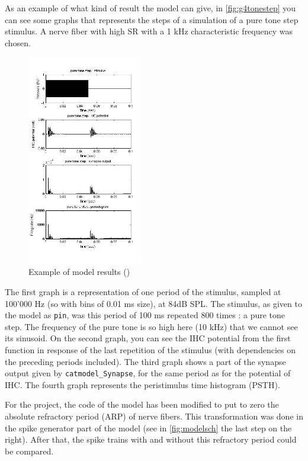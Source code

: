 As an example of what kind of result the model can give,
in \autoref{fig:g4tonestep} you can see some graphs that represents the steps of a 
simulation of a pure tone step stimulus.
A nerve fiber with high SR with a 1 kHz characteristic frequency 
was chosen.


\begin{figure}[h]
	\centering
	\includegraphics[width=0.45\textwidth]{images/g4-tonestep-column2.jpg}
	\caption{Example of model results (\cite{Model1})}
	\label{fig:g4tonestep}
\end{figure}

The first graph is a representation of one period of the stimulus, 
sampled at 100'000 Hz (so with bins of 0.01 ms size), at 84dB SPL.
The stimulus, as given to the model as \texttt{pin}, was this period of 100 ms repeated 800
times : a pure tone step. 
The frequency of the pure tone is so high here (10 kHz) that we cannot see its sinusoid.
On the second graph, you can see the IHC potential from the first function
in response of the last repetition of the stimulus 
(with dependencies on the preceding periods included).
The third graph shows a part of the synapse output given by \texttt{catmodel\_Synapse}, 
for the same period as for the potential of IHC.
The fourth graph represents the peristimulus time histogram (PSTH).

For the project, the code of the model has been modified to put to zero 
the absolute refractory period (ARP) of nerve fibers. 
This transformation was done in the spike generator 
part of the model (see in \autoref{fig:modelsch} the last step on the right).
After that, the spike trains with and without this refractory period could be compared.

